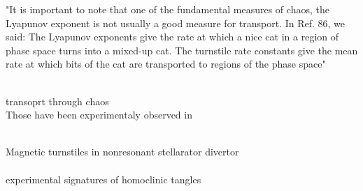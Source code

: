 "It is important to note that one of the fundamental measures of chaos, the Lyapunov exponent is not usually a good measure for transport. In Ref. 86, we said: The Lyapunov exponents give the rate at which a nice cat in a region of phase space turns into a mixed-up cat. The turnstile rate constants give the mean rate at which bits of the cat are transported to regions of the phase space"

\\[10pt]
transoprt through chaos \cite{easton_transport_1991}
\\[10pt]

Those have been experimentaly observed in

\\[10pt]
Magnetic turnstiles in nonresonant stellarator divertor
\\[10pt]

\\[10pt]
experimental signatures of homoclinic tangles \cite{evans_experimental_2005}
\\[10pt]



